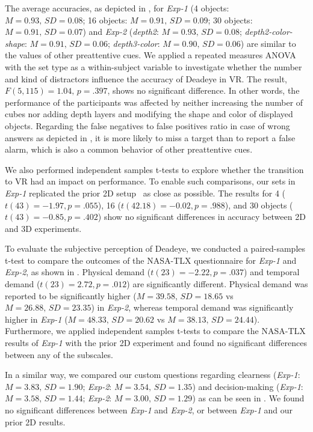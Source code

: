 \documentclass[journal]{vgtc}                %
\begin{document}
The average accuracies, as depicted in , for \textit{Exp-1} (4 objects: $M = 0.93,\,SD = 0.08$; 16 objects: $M = 0.91,\,SD = 0.09$; 30 objects: $M = 0.91,\,SD = 0.07$) and \textit{Exp-2} (\textit{depth2}: $M = 0.93,\,SD = 0.08$; \textit{depth2-color-shape}: $M = 0.91,\,SD = 0.06$; \textit{depth3-color}: $M = 0.90,\,SD = 0.06$) are similar to the values of other preattentive cues. We applied a repeated measures ANOVA with the set type as a within-subject variable to investigate whether the number and kind of distractors influence the accuracy of Deadeye in VR. The result, $F(5,115) = 1.04,\,p = .397$, shows no significant difference. In other words, the performance of the participants was affected by neither increasing the number of cubes nor adding depth layers and modifying the shape and color of displayed objects. Regarding the false negatives to false positives ratio in case of wrong answers as depicted in , it is more likely to miss a target than to report a false alarm, which is also a common behavior of other preattentive cues.

We also performed independent samples t-tests to explore whether the transition to VR had an impact on performance. To enable such comparisons, our sets in \textit{Exp-1} replicated the prior 2D setup~\cite{krekhov2019deadeye} as close as possible. The results for 4 ($t(43) = -1.97, p = .055$), 16 ($t(42.18) = -0.02, p = .988$), and 30 objects ($t(43) = -0.85, p = .402$) show no significant differences in accuracy between 2D and 3D experiments.


To evaluate the subjective perception of Deadeye, we conducted a paired-samples t-test to compare the outcomes of the NASA-TLX questionnaire for \textit{Exp-1} and \textit{Exp-2}, as shown in . Physical demand ($t(23) = -2.22, p = .037$) and temporal demand ($t(23) = 2.72, p = .012$) are significantly different. Physical demand was reported to be significantly higher ($M = 39.58,\,SD = 18.65$ vs $M = 26.88,\,SD = 23.35$) in \textit{Exp-2}, whereas temporal demand was significantly higher in \textit{Exp-1} ($M = 48.33,\,SD = 20.62$ vs $M = 38.13,\,SD = 24.44$). Furthermore, we applied independent samples t-tests to compare the NASA-TLX results of \textit{Exp-1} with the prior 2D experiment and found no significant differences between any of the subscales. 



In a similar way, we compared our custom questions regarding clearness (\textit{Exp-1}: $M = 3.83,\,SD = 1.90$; \textit{Exp-2}: $M = 3.54,\,SD = 1.35$) and decision-making (\textit{Exp-1}: $M = 3.58,\,SD = 1.44$; \textit{Exp-2}: $M = 3.00,\,SD = 1.29$) as can be seen in . We found no significant differences between \textit{Exp-1} and \textit{Exp-2}, or between \textit{Exp-1} and our prior 2D results. 
\end{document}

